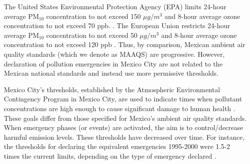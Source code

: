 \documentclass[alpha-refs]{wiley-article}
\begin{document}
The United States Environmental Protection Agency (EPA) limits 24-hour average $\text{PM}_{10}$ concentration to not exceed 150 $\mu g/m^3$ and 8-hour average ozone concentration to not exceed 70 ppb. \citep{CAA1990}. The European Union restricts 24-hour average $\text{PM}_{10}$ concentration to not exceed 50 $\mu g/m^3$ and 8-hour average ozone concentration to not exceed 120 ppb \citep{EU2016}. Thus, by comparison, Mexican ambient air quality standards (which we denote as MAAQS) are progressive. However, declaration of pollution emergencies in Mexico City are not related to the Mexican national standards and instead use more permissive thresholds.

Mexico City's thresholds, established by the Atmospheric Environmental Contingency Program in Mexico City, are used to indicate times when pollutant concentrations are high enough to cause significant damage to human health \citep{mc2016}. These goals differ from those specified for Mexico's ambient air quality standards. When emergency phases (or events) are activated, the aim is to control/decrease harmful emission levels.  These thresholds have decreased over time. For instance, the thresholds for declaring the equivalent emergencies 1995-2000 were 1.5-2 times the current limits, depending on the type of emergency declared \citep{mc1996}.
\end{document}

